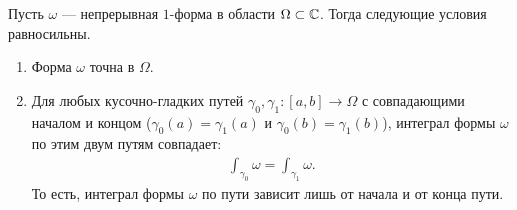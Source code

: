 \documentclass[../complex-analysis.tex]{subfiles}
\begin{document}
\begin{thm}
 \label{theorem:exact_1_form}
 Пусть $\omega$ --- непрерывная $1$-форма в области $\Omega \subset \mathbb{C}$. Тогда следующие условия равносильны.
 \begin{enumerate}
  \item \label{enum1:theorem:exact_1_form} Форма $\omega$ точна в $\Omega$.
  \item \label{enum2:theorem:exact_1_form} Для любых кусочно-гладких путей $\gamma_0, \gamma_1 \colon [a,b] \to \Omega$ с совпадающими началом и концом \textup{(}$\gamma_0(a)=\gamma_1(a)$ и $\gamma_0(b)=\gamma_1(b)$\textup{)}, интеграл формы $ \omega $ по этим двум путям совпадает:
   \begin{align}
    \label{eq:exact_1_form:integral_equals}
    \int_{\gamma_0}  \omega = \int_{\gamma_1} \omega.
   \end{align} То есть, интеграл формы $ \omega $ по пути зависит лишь от начала и от конца пути.
 \end{enumerate}
\end{thm}
\end{document}
